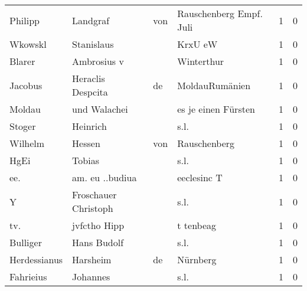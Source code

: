 \begin{tabular}{llllrr}
                  Philipp &                           Landgraf &         von &                     Rauschenberg Empf. Juli &          1 &         0 \\
                  Wkowskl &                         Stanislaus &             &                                     KrxU eW &          1 &         0 \\
                   Blarer &                        Ambrosius v &             &                                  Winterthur &          1 &         0 \\
                  Jacobus &                  Heraclis Despcita &          de &                              MoldauRumänien &          1 &         0 \\
                   Moldau &                       und Walachei &             &                         es je einen Fürsten &          1 &         0 \\
                   Stoger &                           Heinrich &             &                                        s.l. &          1 &         0 \\
                  Wilhelm &                             Hessen &         von &                                Rauschenberg &          1 &         0 \\
                     HgEi &                             Tobias &             &                                        s.l. &          1 &         0 \\
                      ee. &                    am. eu ..budiua &             &                                 eeclesinc T &          1 &         0 \\
                        Y &               Froschauer Christoph &             &                                        s.l. &          1 &         0 \\
                      tv. &                       jvfctho Hipp &             &                                   t tenbeag &          1 &         0 \\
                 Bulliger &                        Hans Budolf &             &                                        s.l. &          1 &         0 \\
             Herdessianus &                           Harsheim &          de &                                    Nürnberg &          1 &         0 \\
                Fahrieius &                           Johannes &             &                                        s.l. &          1 &         0 \\

\end{tabular}
